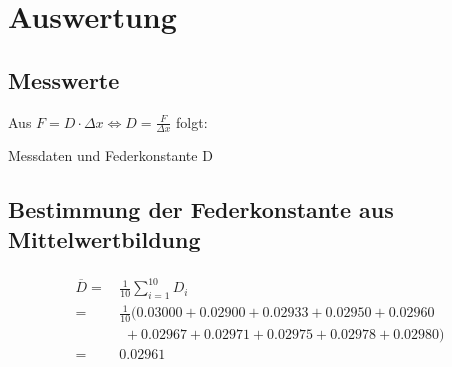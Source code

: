 \newpage
\section{Auswertung}
\label{sec:Auswertung}
\subsection{Messwerte}
Aus $F = D \cdot \Delta x \Leftrightarrow D = \frac{F}{\Delta x}$ folgt:
\begin{table}[H]
  \centering
  
  \caption{\label{tab:Messdaten}Messdaten und Federkonstante D}
\end{table}

\subsection{Bestimmung der Federkonstante aus Mittelwertbildung}
\begin{multline}
\begin{aligned}
  \overline{D} {} = & \,\frac{1}{10} \sum_{i=1}^{10} D_i \\
        =& \,\frac{1}{10} (0.03000 + 0.02900 + 0.02933 + 0.02950 + 0.02960\\
        & \:\;+ 0.02967 + 0.02971 + 0.02975 + 0.02978 + 0.02980)\\
        =& \,0.02961
\end{aligned}
\end{multline}
\newpage
